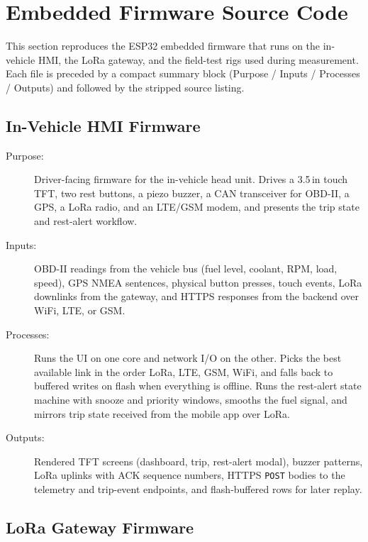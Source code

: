 \section{Embedded Firmware Source Code}
\label{sec:app_embedded_code}

This section reproduces the ESP32 embedded firmware that runs on the in-vehicle HMI, the LoRa gateway, and the field-test rigs used during measurement. Each file is preceded by a compact summary block (Purpose / Inputs / Processes / Outputs) and followed by the stripped source listing.

\subsection{In-Vehicle HMI Firmware}
\label{sec:code_hmi_phase1}

\begin{description}
\item[Purpose:] Driver-facing firmware for the in-vehicle head unit. Drives a 3.5\,in touch TFT, two rest buttons, a piezo buzzer, a CAN transceiver for OBD-II, a GPS, a LoRa radio, and an LTE/GSM modem, and presents the trip state and rest-alert workflow.
\item[Inputs:] OBD-II readings from the vehicle bus (fuel level, coolant, RPM, load, speed), GPS NMEA sentences, physical button presses, touch events, LoRa downlinks from the gateway, and HTTPS responses from the backend over WiFi, LTE, or GSM.
\item[Processes:] Runs the UI on one core and network I/O on the other. Picks the best available link in the order LoRa, LTE, GSM, WiFi, and falls back to buffered writes on flash when everything is offline. Runs the rest-alert state machine with snooze and priority windows, smooths the fuel signal, and mirrors trip state received from the mobile app over LoRa.
\item[Outputs:] Rendered TFT screens (dashboard, trip, rest-alert modal), buzzer patterns, LoRa uplinks with ACK sequence numbers, HTTPS \texttt{POST} bodies to the telemetry and trip-event endpoints, and flash-buffered rows for later replay.
\end{description}



\subsection{LoRa Gateway Firmware}
\label{sec:code_lora_gateway}

